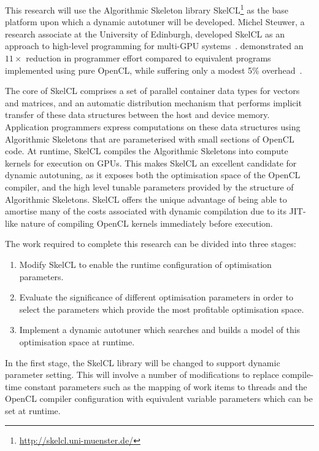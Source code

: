 This research will use the Algorithmic Skeleton library
SkelCL\footnote{\url{http://skelcl.uni-muenster.de/}} as the base
platform upon which a dynamic autotuner will be developed. Michel
Steuwer, a research associate at the University of Edinburgh,
developed SkelCL as an approach to high-level programming for
multi-GPU systems~\cite{Steuwer2011,
  Steuwer2013a}. \citeauthor{Steuwer2012} demonstrated an $11\times$
reduction in programmer effort compared to equivalent programs
implemented using pure OpenCL, while suffering only a modest 5\%
overhead~\cite{Steuwer2012}.

The core of SkelCL comprises a set of parallel container data types
for vectors and matrices, and an automatic distribution mechanism that
performs implicit transfer of these data structures between the host
and device memory. Application programmers express computations on
these data structures using Algorithmic Skeletons that are
parameterised with small sections of OpenCL code. At runtime, SkelCL
compiles the Algorithmic Skeletons into compute kernels for execution
on GPUs. This makes SkelCL an excellent candidate for dynamic
autotuning, as it exposes both the optimisation space of the OpenCL
compiler, and the high level tunable parameters provided by the
structure of Algorithmic Skeletons.
SkelCL offers the unique advantage of being able to amortise many of
the costs associated with dynamic compilation due to its JIT-like
nature of compiling OpenCL kernels immediately before execution.

The work required to complete this research can be divided into three
stages:

\begin{enumerate}
\item Modify SkelCL to enable the runtime configuration of
optimisation parameters.
\item Evaluate the significance of different optimisation parameters
in order to select the parameters which provide the most profitable
optimisation space.
\item Implement a dynamic autotuner which searches and builds a model
of this optimisation space at runtime.
\end{enumerate}

In the first stage, the SkelCL library will be changed to support
dynamic parameter setting. This will involve a number of modifications
to replace compile-time constant parameters such as the mapping of
work items to threads and the OpenCL compiler configuration with
equivalent variable parameters which can be set at runtime.

